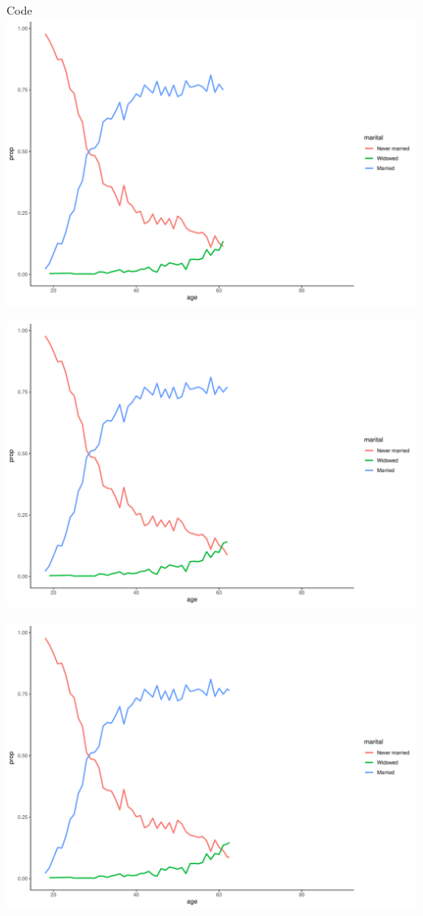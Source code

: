 \documentclass[
  ignorenonframetext,
]{beamer}
\begin{document}
\begin{frame}[fragile]{Code}
\includegraphics{gss_cat_files/figure-beamer/unnamed-chunk-1-65.pdf}

\includegraphics{gss_cat_files/figure-beamer/unnamed-chunk-1-66.pdf}

\includegraphics{gss_cat_files/figure-beamer/unnamed-chunk-1-67.pdf}


\end{frame}
\end{document}

